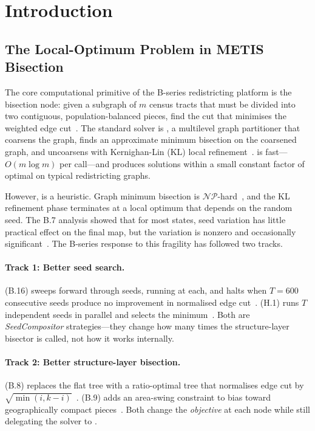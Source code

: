 \section{Introduction}
\label{sec:introduction}

\subsection{The Local-Optimum Problem in METIS Bisection}

The core computational primitive of the B-series redistricting platform is
the bisection node: given a subgraph of $m$ census tracts that must be
divided into two contiguous, population-balanced pieces, find the cut that
minimises the weighted edge cut~\citep{b8paper, b11paper}.
The standard solver is \metis{}, a multilevel graph partitioner that
coarsens the graph, finds an approximate minimum bisection on the coarsened
graph, and uncoarsens with Kernighan-Lin (KL) local refinement~\citep{karypis1998}.
\metis{} is fast---$O(m \log m)$ per call---and produces solutions within a
small constant factor of optimal on typical redistricting graphs.

However, \metis{} is a heuristic.
Graph minimum bisection is $\mathcal{NP}$-hard~\citep{garey1976}, and the KL
refinement phase terminates at a local optimum that depends on the random
seed.
The B.7 analysis showed that for most states, seed variation has little
practical effect on the final map, but the variation is nonzero and
occasionally significant~\citep{b7paper}.
The B-series response to this fragility has followed two tracks.

\paragraph{Track 1: Better seed search.}
\cs{} (B.16) sweeps forward through seeds, running \metis{} at each, and
halts when $T=600$ consecutive seeds produce no improvement in normalised
edge cut~\citep{b16paper}.
\be{} (H.1) runs $T$ independent \metis{} seeds in parallel and selects
the minimum~\citep{h1paper}.
Both are \emph{SeedCompositor} strategies---they change how many times the
structure-layer bisector is called, not how it works internally.

\paragraph{Track 2: Better structure-layer bisection.}
\geosec{} (B.8) replaces the flat tree with a ratio-optimal tree that
normalises edge cut by $\sqrt{\min(i,k-i)}$~\citep{b8paper}.
\areasec{} (B.9) adds an area-swing constraint to bias toward
geographically compact pieces~\citep{b9paper}.
Both change the \emph{objective} at each node while still delegating
the solver to \metis{}.

